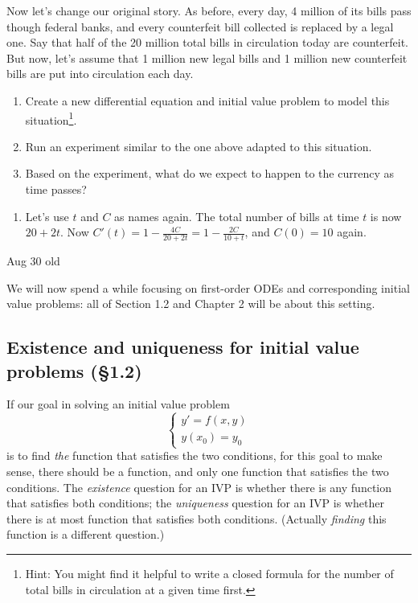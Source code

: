 \documentclass[12pt]{amsart}
\numberwithin{equation}{section}
\theoremstyle{plain} %
\newcommand{\Aug}[1]{Aug #1 old}
\theoremstyle{definition}
\theoremstyle{remark}
\begin{document}
Now let's change our original story. As before, every day, 4 million of its bills pass though federal banks, and every counterfeit bill collected is replaced by a legal one. Say that half of the 20 million total bills in circulation today are counterfeit. But now, let's assume that 1 million new legal bills and 1 million new counterfeit bills are put into circulation each day.

\begin{enumerate}
\item Create a new differential equation and initial value problem to model this situation\footnote{Hint: You might find it helpful to write a closed formula for the number of total bills in circulation at a given time first.}. 
\item Run an experiment similar to the one above adapted to this situation.
\item Based on the experiment, what do we expect to happen to the currency as time passes?
\end{enumerate}
\begin{framed}
\begin{enumerate}
\item Let's use $t$ and $C$ as names again. The total number of bills at time $t$ is now $20+2t$. Now $C'(t) = 1 - \frac{4 C}{20+2t} = 1-\frac{2C}{10+t}$, and $C(0)=10$ again.
\end{enumerate}
\end{framed}




\Aug{30}

We will now spend a while focusing on first-order ODEs and corresponding initial value problems: all of Section 1.2 and Chapter 2 will be about this setting.

\subsection*{Existence and uniqueness for initial value problems (\S1.2)}
If our goal in solving an initial value problem
\[\begin{cases} y' = f(x,y) \\ y(x_0) = y_0\end{cases}\]
 is to find \emph{the} function that satisfies the two conditions, for this goal to make sense, there should be a function, and only one function that satisfies the two conditions. The \emph{existence} question for an IVP is whether there is any function that satisfies both conditions; the \emph{uniqueness} question for an IVP is whether there is at most function that satisfies both conditions. (Actually \emph{finding} this function is a different question.)
\end{document}
